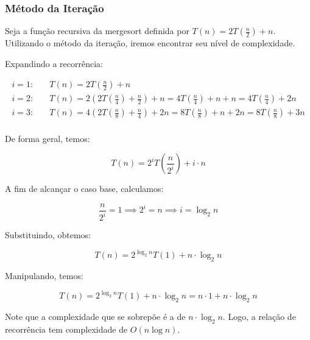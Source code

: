 \subsubsection{Método da Iteração}
Seja a função recursiva da mergesort definida por \( T(n) = 2T\left(\frac{n}{2}\right) + n \). Utilizando o método da iteração, iremos encontrar seu nível de complexidade. 

Expandindo a recorrência:

\begin{align*}
i = 1 : &\quad T(n) = 2T\left(\frac{n}{2}\right) + n \\
i = 2 : &\quad T(n) = 2\left(2T\left(\frac{n}{4}\right) + \frac{n}{2}\right) + n = 4T\left(\frac{n}{4}\right) + n + n = 4T\left(\frac{n}{4}\right) + 2n\\
i = 3 : &\quad T(n) = 4\left(2T\left(\frac{n}{8}\right) + \frac{n}{4}\right) + 2n = 8T\left(\frac{n}{8}\right) + n + 2n = 8T\left(\frac{n}{8}\right) + 3n\\
\end{align*}

De forma geral, temos:

\[
T(n) = 2^i T\left(\frac{n}{2^i}\right) + i \cdot n
\]

A fim de alcançar o caso base, calculamos:

\[
\frac{n}{2^i} = 1 \implies 2^i = n \implies i = \log_{2}{n}
\]

Substituindo, obtemos:

\[
T(n) = 2^{\log_{2}{n}} T(1) + n \cdot \log_{2}{n}
\]

Manipulando, temos:

\[
T(n) = 2^{\log_{2}{n}} T(1) + n \cdot \log_{2}{n} = n \cdot 1 + n \cdot \log_{2}{n}
\]

Note que a complexidade que se sobrepõe é a de \( n \cdot \log_{2}{n} \). Logo, a relação de recorrência tem complexidade de \( O(n \log n) \).
